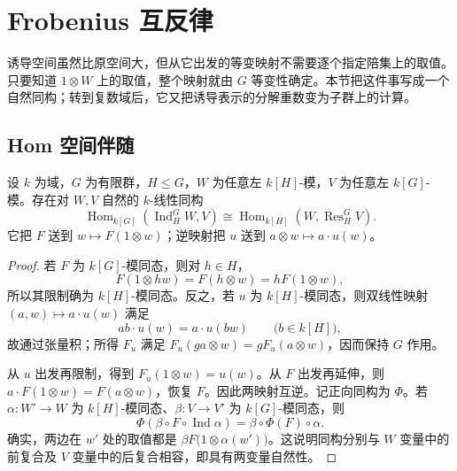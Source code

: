 

\section{Frobenius 互反律}
\label{b5:sec:0302}

诱导空间虽然比原空间大，但从它出发的等变映射不需要逐个指定陪集上的取值。只要知道 \(1\otimes W\) 上的取值，整个映射就由 \(G\) 等变性确定。本节把这件事写成一个自然同构；转到复数域后，它又把诱导表示的分解重数变为子群上的计算。

\subsection{Hom 空间伴随}
\label{b5:subsec:0302:01}

\begin{theorem}\label{b5:thm:frobenius-reciprocity}
	设 \(k\) 为域，\(G\) 为有限群，\(H\le G\)，\(W\) 为任意左 \(k[H]\)-模，\(V\) 为任意左 \(k[G]\)-模。存在对 \(W,V\) 自然的 \(k\)-线性同构
	\begin{equation}\label{b5:eq:frobenius-hom}
		\operatorname{Hom}_{k[G]}(\operatorname{Ind}_H^G W,V) \cong \operatorname{Hom}_{k[H]}(W,\operatorname{Res}_H^G V).
	\end{equation}
	它把 \(F\) 送到 \(w\mapsto F(1\otimes w)\)；逆映射把 \(u\) 送到 \(a\otimes w\mapsto a\cdot u(w)\)。
\end{theorem}
\begin{proof}
	若 \(F\) 为 \(k[G]\)-模同态，则对 \(h\in H\)，
	\[
		F(1\otimes hw)=F(h\otimes w)=hF(1\otimes w),
	\]
	所以其限制确为 \(k[H]\)-模同态。反之，若 \(u\) 为 \(k[H]\)-模同态，则双线性映射 \((a,w)\mapsto a\cdot u(w)\) 满足
	\[
		ab\cdot u(w)=a\cdot u(bw)\qquad\bigl(b\in k[H]\bigr),
	\]
	故通过张量积；所得 \(F_u\) 满足 \(F_u(ga\otimes w)=gF_u(a\otimes w)\)，因而保持 \(G\) 作用。

	从 \(u\) 出发再限制，得到 \(F_u(1\otimes w)=u(w)\)。从 \(F\) 出发再延伸，则 \(a\cdot F(1\otimes w)=F(a\otimes w)\)，恢复 \(F\)。因此两映射互逆。记正向同构为 \(\Phi\)。若 \(\alpha:W'\rightarrow W\) 为 \(k[H]\)-模同态、\(\beta:V\rightarrow V'\) 为 \(k[G]\)-模同态，则
	\[
		\Phi\left(\beta\circ F\circ\operatorname{Ind}\alpha\right) =\beta\circ\Phi(F)\circ\alpha.
	\]
	确实，两边在 \(w'\) 处的取值都是 \(\beta F\bigl(1\otimes\alpha(w')\bigr)\)。这说明同构分别与 \(W\) 变量中的前复合及 \(V\) 变量中的后复合相容，即具有两变量自然性。
\end{proof}

